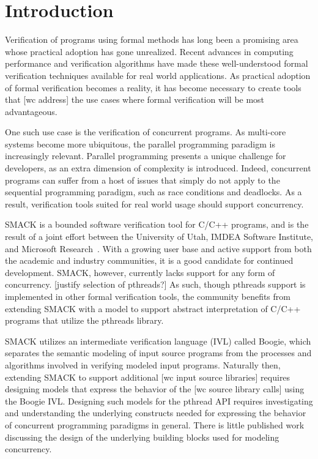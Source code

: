 \chapter{Introduction}\label{thesis_intro}

Verification of programs using formal methods has long been a promising area whose practical adoption has gone unrealized.  Recent advances in computing performance and verification algorithms have made these well-understood formal verification techniques available for real world applications.  As practical adoption of formal verification becomes a reality, it has become necessary to create tools that [wc address] the use cases where formal verification will be most advantageous.

One such use case is the verification of concurrent programs.  As multi-core systems become more ubiquitous, the parallel programming paradigm is increasingly relevant.  Parallel programming presents a unique challenge for developers, as an extra dimension of complexity is introduced.  Indeed, concurrent programs can suffer from a host of issues that simply do not apply to the sequential programming paradigm, such as race conditions and deadlocks.  As a result, verification tools suited for real world usage should support concurrency.

SMACK is a bounded software verification tool for C/C++ programs, and is the result of a joint effort between the University of Utah, IMDEA Software Institute, and Microsoft Research~\cite{smack}.  With a growing user base and active support from both the academic and industry communities, it is a good candidate for continued development.  SMACK, however, currently lacks support for any form of concurrency.  [justify selection of pthreads?]  As such, though pthreads support is implemented in other formal verification tools, the community benefits from extending SMACK with a model to support abstract interpretation of C/C++ programs that utilize the pthreads library.

SMACK utilizes an intermediate verification language (IVL) called Boogie, which separates the semantic modeling of input source programs from the processes and algorithms involved in verifying modeled input programs.  Naturally then, extending SMACK to support additional [wc input source libraries] requires designing models that express the behavior of the [wc source library calls] using the Boogie IVL.  Designing such models for the pthread API requires investigating and understanding the underlying constructs needed for expressing the behavior of concurrent programming paradigms in general.  There is little published work discussing the design of the underlying building blocks used for modeling concurrency.

